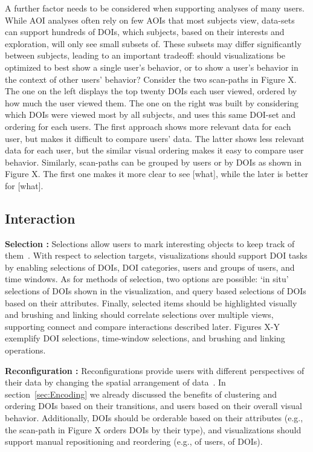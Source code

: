 A further factor needs to be considered when supporting analyses of many users. While AOI analyses often rely on few AOIs that most subjects view, data-sets can support hundreds of DOIs, which subjects, based on their interests and exploration, will only see small subsets of. These subsets may differ significantly between subjects, leading to an important tradeoff: should visualizations be optimized to best show a single user's behavior, or to show a user's behavior in the context of other users' behavior? Consider the two scan-paths in Figure X. The one on the left displays the top twenty DOIs each user viewed, ordered by how much the user viewed them. The one on the right was built by considering which DOIs were viewed most by all subjects, and uses this same DOI-set and ordering for each users. The first approach shows more relevant data for each user, but makes it difficult to compare users' data. The latter shows less relevant data for each user, but the similar visual ordering makes it easy to compare user behavior. Similarly, scan-paths can be grouped by users or by DOIs as shown in Figure X. The first one makes it more clear to see [what], while the later is better for [what].

\subsection{Interaction}
\textbf{Selection :}
Selections allow users to mark interesting objects to keep track of them~\cite{yi2007toward}. With respect to selection targets, visualizations should support DOI tasks by enabling selections of DOIs, DOI categories, users and groups of users, and time windows.  As for methods of selection, two options are possible: `in situ' selections of DOIs shown in the visualization, and query based selections of DOIs based on their attributes. Finally, selected items should be highlighted visually and brushing and linking should correlate selections over multiple views, supporting connect and compare interactions described later. Figures X-Y exemplify DOI selections, time-window selections, and brushing and linking operations.
	
\textbf{Reconfiguration :}
Reconfigurations provide users with different perspectives of their data by changing the spatial arrangement of data~\cite{yi2007toward}.  In section~\ref{sec:Encoding} we already discussed the benefits of clustering and ordering DOIs based on their transitions, and users based on their overall visual behavior. Additionally, DOIs should be orderable based on their attributes (e.g., the scan-path in Figure X orders DOIs by their type), and visualizations should support manual repositioning and reordering (e.g., of users, of DOIs).

